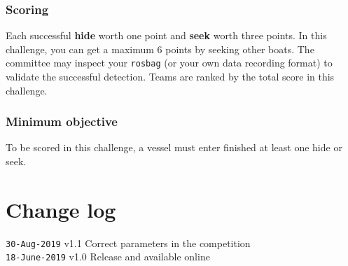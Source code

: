 \documentclass[12pt]{article}
\begin{document}
\subsubsection{Scoring}

Each successful \textbf{hide} worth one point and \textbf{seek} worth three points.
In this challenge, you can get a maximum 6 points by seeking other boats.
The committee may inspect your \texttt{rosbag} (or your own data recording format) to validate the successful detection. 
Teams are ranked by the total score in this challenge.


\subsubsection{Minimum objective}
To be scored in this challenge, a vessel must enter finished at least one hide or seek. 


\section*{Change log}

\texttt{30-Aug-2019} v1.1 Correct parameters in the competition \\
\texttt{18-June-2019} v1.0 Release and available online
\end{document}
